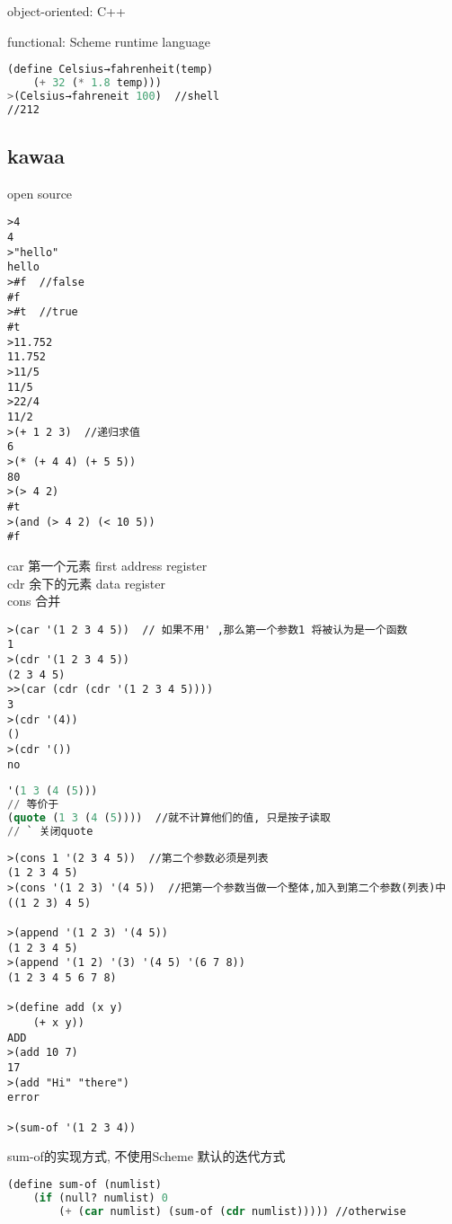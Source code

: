 \documentclass{article}
\begin{document}
object-oriented:
C++

functional:
Scheme	runtime language

\begin{lstlisting}[language = Lisp]
(define Celsius→fahrenheit(temp)
	(+ 32 (* 1.8 temp)))
>(Celsius→fahreneit 100)  //shell
//212
\end{lstlisting}

\subsection{kawaa}
open source
\begin{verbatim}
>4
4
>"hello"
hello
>#f  //false
#f
>#t  //true
#t
>11.752
11.752
>11/5
11/5
>22/4
11/2
>(+ 1 2 3)  //递归求值
6
>(* (+ 4 4) (+ 5 5))
80
>(> 4 2)
#t
>(and (> 4 2) (< 10 5))
#f
\end{verbatim}

\bigskip\noindent
car 第一个元素 first  address register\\
cdr 余下的元素  data register\\
cons 合并\\
\begin{verbatim}
>(car '(1 2 3 4 5))  // 如果不用' ,那么第一个参数1 将被认为是一个函数
1
>(cdr '(1 2 3 4 5))
(2 3 4 5)
>>(car (cdr (cdr '(1 2 3 4 5))))
3
>(cdr '(4))
()
>(cdr '())
no
\end{verbatim}

\begin{lstlisting}[language = Lisp]
'(1 3 (4 (5)))
// 等价于
(quote (1 3 (4 (5))))  //就不计算他们的值, 只是按子读取
// ` 关闭quote
\end{lstlisting}

\begin{verbatim}
>(cons 1 '(2 3 4 5))  //第二个参数必须是列表
(1 2 3 4 5)
>(cons '(1 2 3) '(4 5))  //把第一个参数当做一个整体,加入到第二个参数(列表)中
((1 2 3) 4 5)

>(append '(1 2 3) '(4 5))
(1 2 3 4 5)
>(append '(1 2) '(3) '(4 5) '(6 7 8))
(1 2 3 4 5 6 7 8)

>(define add (x y)
	(+ x y))
ADD
>(add 10 7)
17
>(add "Hi" "there")
error

>(sum-of '(1 2 3 4))
\end{verbatim}

sum-of的实现方式, 不使用Scheme 默认的迭代方式
\begin{lstlisting}[language = Lisp]
(define sum-of (numlist)
	(if (null? numlist) 0
		(+ (car numlist) (sum-of (cdr numlist))))) //otherwise
\end{lstlisting}
\end{document}
